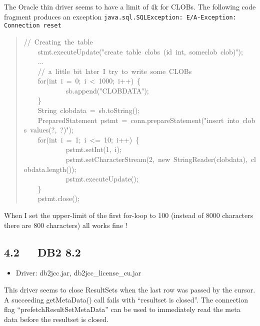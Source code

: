 \documentclass[10pt,a4paper,english]{article}
\begin{document}
The Oracle thin driver seems to have a limit of 4k for CLOBs. The following code fragment produces an exception \texttt{java.sql.SQLException: E/A-Exception: Connection reset}
\begin{quote}{\ttfamily \raggedright \noindent
//~Creating~the~table~\\
~~~~stmt.executeUpdate("create~table~clobs~(id~int,~someclob~clob)");~\\
~~~~...~\\
~~~~//~a~little~bit~later~I~try~to~write~some~CLOBs~\\
~~~~for(int~i~=~0;~i~<~1000;~i++)~{\{}~\\
~~~~~~~~~~~~sb.append("CLOBDATA");~\\
~~~~{\}}~\\
~~~~String~clobdata~=~sb.toString();~\\
~~~~PreparedStatement~pstmt~=~conn.prepareStatement("insert~into~clobs~values(?,~?)");~\\
~~~~for(int~i~=~1;~i~<=~10;~i++)~{\{}~\\
~~~~~~~~~~~~pstmt.setInt(1,~i);~\\
~~~~~~~~~~~~pstmt.setCharacterStream(2,~new~StringReader(clobdata),~clobdata.length());~\\
~~~~~~~~~~~~pstmt.executeUpdate();~\\
~~~~{\}}~\\
~~~~pstmt.close();
}\end{quote}

When I set the upper-limit of the first for-loop to 100 (instead of 8000 characters there are 800 characters) all works fine !



\hypertarget{db2-8-2}{}
\subsection*{4.2~~~DB2 8.2}
\begin{itemize}
\item {} 
Driver: db2jcc.jar, db2jcc{\_}license{\_}cu.jar

\end{itemize}

This driver seems to close ResultSets when the last row was passed by the cursor. A succeeding getMetaData() call fails with ``resultset is closed''. The connection flag ``prefetchResultSetMetaData'' can be used to immediately read the meta data before the resultset is closed.
\end{document}
